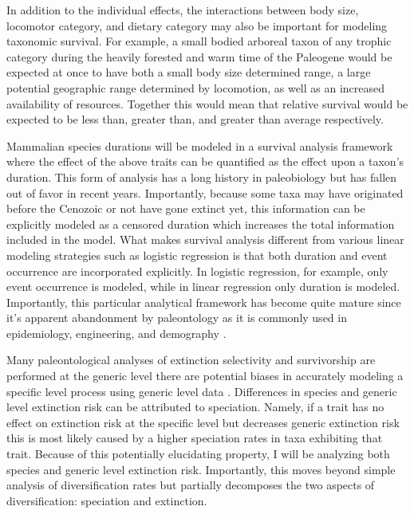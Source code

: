 \documentclass[11pt,letterpaper]{article}
\begin{document}
In addition to the individual effects, the interactions between body size, locomotor category, and dietary category may also be important for modeling taxonomic survival. For example, a small bodied arboreal taxon of any trophic category during the heavily forested and warm time of the Paleogene would be expected at once to have both a small body size determined range, a large potential geographic range determined by locomotion, as well as an increased availability of resources. Together this would mean that relative survival would be expected to be less than, greater than, and greater than average respectively. 

Mammalian species durations will be modeled in a survival analysis framework where the effect of the above traits can be quantified as the effect upon a taxon's duration. This form of analysis has a long history in paleobiology \citep{Simpson1944,Simpson1953,VanValen1979,Baumiller1993,Foote1988} but has fallen out of favor in recent years. Importantly, because some taxa may have originated before the Cenozoic or not have gone extinct yet, this information can be explicitly modeled as a censored duration which increases the total information included in the model. What makes survival analysis different from various linear modeling strategies such as logistic regression is that both duration and event occurrence are incorporated explicitly. In logistic regression, for example, only event occurrence is modeled, while in linear regression only duration is modeled. Importantly, this particular analytical framework has become quite mature since it's apparent abandonment by paleontology as it is commonly used in epidemiology, engineering, and demography \citep{Kleinbaum2005}. 

Many paleontological analyses of extinction selectivity and survivorship are performed at the generic level \citep{Tomiya2013,Liow2008,Harnik2013,Finnegan2008,Foote2006} there are potential biases in accurately modeling a specific level process using generic level data \citep{Raup1975,Sepkoski1975,Simpson2006,Raup1991a,VanValen1979}. Differences in species and generic level extinction risk can be attributed to speciation. Namely, if a trait has no effect on extinction risk at the specific level but decreases generic extinction risk this is most likely caused by a higher speciation rates in taxa exhibiting that trait. Because of this potentially elucidating property, I will be analyzing both species and generic level extinction risk. Importantly, this moves beyond simple analysis of diversification rates but partially decomposes the two aspects of diversification: speciation and extinction.
\end{document}
